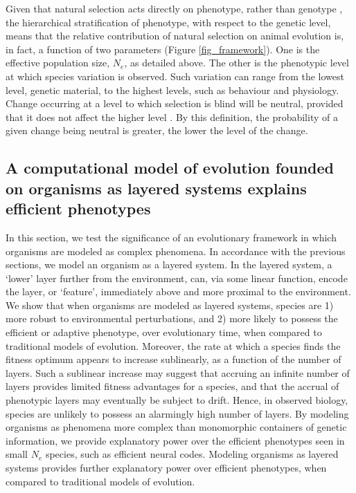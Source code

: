 \documentclass[twocolumn]{article}
\begin{document}
Given that natural selection acts directly on phenotype, rather than genotype \cite{mayr_1997}, the hierarchical stratification of phenotype, with respect to the genetic level, means that the relative contribution of natural selection on animal evolution is, in fact, a function of two parameters (Figure \ref{fig_framework}). One is the effective population size, $N_e$, as detailed above. The other is the phenotypic level at which species variation is observed. Such variation can range from the lowest level, genetic material, to the highest levels, such as behaviour and physiology. Change occurring at a level to which selection is blind will be neutral, provided that it does not affect the higher level \cite{mayr_1997, wideman_doolittle_2019, Zhang_2018}. By this definition, the probability of a given change being neutral is greater, the lower the level of the change. 

\subsection{A computational model of evolution founded on organisms as layered systems explains efficient phenotypes}

In this section, we test the significance of an evolutionary framework in which organisms are modeled as complex phenomena. In accordance with the previous sections, we model an organism as a layered system. In the layered system, a `lower' layer further from the environment, can, via some linear function, encode the layer, or `feature', immediately above and more proximal to the environment. We show that when organisms are modeled as layered systems, species are 1) more robust to environmental perturbations, and 2) more likely to possess the efficient or adaptive phenotype, over evolutionary time, when compared to traditional models of evolution. Moreover, the rate at which a species finds the fitness optimum appears to increase sublinearly, as a function of the number of layers. Such a sublinear increase may suggest that accruing an infinite number of layers provides limited fitness advantages for a species, and that the accrual of phenotypic layers may eventually be subject to drift. Hence, in observed biology, species are unlikely to possess an alarmingly high number of layers. By modeling organisms as phenomena more complex than monomorphic containers of genetic information, we provide explanatory power over the efficient phenotypes seen in small $N_e$ species, such as efficient neural codes. Modeling organisms as layered systems provides further explanatory power over efficient phenotypes, when compared to traditional models of evolution.
\end{document}
